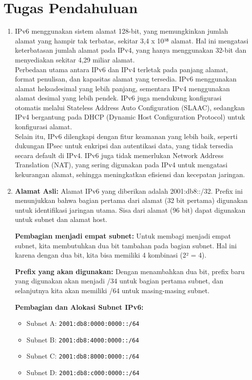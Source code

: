 \section{Tugas Pendahuluan}
\begin{enumerate}
    \item IPv6 menggunakan sistem alamat 128-bit, yang memungkinkan jumlah alamat yang hampir tak terbatas, sekitar 3,4 x 10³⁸ alamat. Hal ini mengatasi keterbatasan jumlah alamat pada IPv4, yang hanya menggunakan 32-bit dan menyediakan sekitar 4,29 miliar alamat.\\
    Perbedaan utama antara IPv6 dan IPv4 terletak pada panjang alamat, format penulisan, dan kapasitas alamat yang tersedia. IPv6 menggunakan alamat heksadesimal yang lebih panjang, sementara IPv4 menggunakan alamat desimal yang lebih pendek. IPv6 juga mendukung konfigurasi otomatis melalui Stateless Address Auto Configuration (SLAAC), sedangkan IPv4 bergantung pada DHCP (Dynamic Host Configuration Protocol) untuk konfigurasi alamat.\\
    Selain itu, IPv6 dilengkapi dengan fitur keamanan yang lebih baik, seperti dukungan IPsec untuk enkripsi dan autentikasi data, yang tidak tersedia secara default di IPv4. IPv6 juga tidak memerlukan Network Address Translation (NAT), yang sering digunakan pada IPv4 untuk mengatasi kekurangan alamat, sehingga meningkatkan efisiensi dan kecepatan jaringan.

    \item 
    \textbf{Alamat Asli:}
    Alamat IPv6 yang diberikan adalah 2001:db8::/32. Prefix ini menunjukkan bahwa bagian pertama dari alamat (32 bit pertama) digunakan untuk identifikasi jaringan utama. Sisa dari alamat (96 bit) dapat digunakan untuk subnet dan alamat host.

    \textbf{Pembagian menjadi empat subnet:}
    Untuk membagi menjadi empat subnet, kita membutuhkan dua bit tambahan pada bagian subnet. Hal ini karena dengan dua bit, kita bisa memiliki 4 kombinasi (2² = 4).

    \textbf{Prefix yang akan digunakan:}
    Dengan menambahkan dua bit, prefix baru yang digunakan akan menjadi /34 untuk bagian pertama subnet, dan selanjutnya kita akan memiliki /64 untuk masing-masing subnet.

    \textbf{Pembagian dan Alokasi Subnet IPv6:}
    \begin{itemize}
        \item Subnet A: \texttt{2001:db8:0000:0000::/64}
        \item Subnet B: \texttt{2001:db8:4000:0000::/64}
        \item Subnet C: \texttt{2001:db8:8000:0000::/64}
        \item Subnet D: \texttt{2001:db8:c000:0000::/64}
    \end{itemize}


\end{enumerate}
